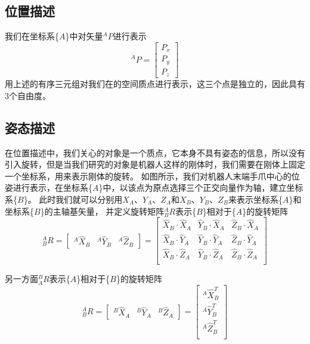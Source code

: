 \documentclass{seuthesis-2022}
\numberwithin{equation}{section}
\begin{document}
\subsection{位置描述}
我们在坐标系\{$A$\}中对矢量$^{A}P$进行表示
\begin{equation}
^{A}P = 
\begin{bmatrix}
  P_{x}\\P_{y}\\P_{z}
\end{bmatrix}
\end{equation}
用上述的有序三元组对我们在的空间质点进行表示，这三个点是独立的，因此具有3个自由度。

\subsection{姿态描述}
在位置描述中，我们关心的对象是一个质点，它本身不具有姿态的信息，所以没有引入旋转，但是当我们研究的对象是机器人这样的刚体时，我们需要在刚体上固定一个坐标系，用来表示刚体的旋转。
如图所示，我们对机器人末端手爪中心的位姿进行表示，在坐标系\{$A$\}中，以该点为原点选择三个正交向量作为轴，建立坐标系\{$B$\}。
此时我们就可以分别用$X_{A}$、$Y_{A}$、$Z_{A}$和$X_{B}$、$Y_{B}$、$Z_{B}$来表示坐标系\{$A$\}和坐标系\{$B$\}的主轴基矢量，
并定义旋转矩阵$^{A}_{B}R$表示\{$B$\}相对于\{$A$\}的旋转矩阵
\begin{equation}
^{A}_{B}R = 
\begin{bmatrix}
  ^{A}\hat{X}_{B} & ^{A}\hat{Y}_{B} & ^{A}\hat{Z}_{B}
\end{bmatrix}
=
\begin{bmatrix}
  \hat{X}_{B} \cdot \hat{X}_{A} & \hat{Y}_{B} \cdot \hat{X}_{A} & \hat{Z}_{B} \cdot \hat{X}_{A}\\
  \hat{X}_{B} \cdot \hat{Y}_{A} & \hat{Y}_{B} \cdot \hat{Y}_{A} & \hat{Z}_{B} \cdot \hat{Y}_{A}\\
  \hat{X}_{B} \cdot \hat{Z}_{A} & \hat{Y}_{B} \cdot \hat{Z}_{A} & \hat{Z}_{B} \cdot \hat{Z}_{A}\\
\end{bmatrix}
\end{equation}

另一方面$^{B}_{A}R$表示\{$A$\}相对于\{$B$\}的旋转矩阵
\begin{equation}
^{A}_{B}R = 
\begin{bmatrix}
  ^{B}\hat{X}_{A} & ^{B}\hat{Y}_{A} & ^{B}\hat{Z}_{A}
\end{bmatrix}
=
\begin{bmatrix}
  ^{A}\hat{X}^{T}_{B}\\
  ^{A}\hat{Y}^{T}_{B}\\
  ^{A}\hat{Z}^{T}_{B}\\
\end{bmatrix}
\end{equation}
\end{document}
